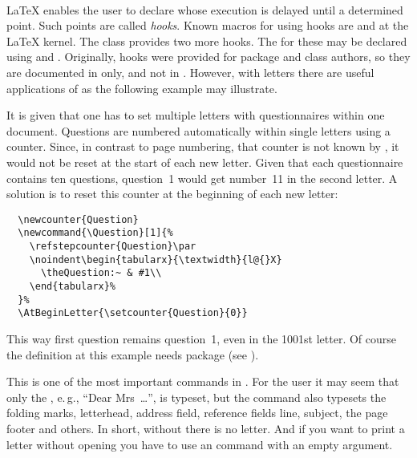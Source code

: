 \begin{Declaration}
  \\
\end{Declaration}
%
%
{\LaTeX} enables the user to declare  whose execution
is delayed until a determined point. Such points are called
\emph{hooks}. Known macros for using hooks are
 and
 at the \LaTeX{} kernel. The class
 provides two more hooks. The  for
these may be declared using  and
. Originally, hooks were
provided for package and class authors, so they are documented in
\cite{latex:clsguide} only, and not in \cite{latex:usrguide}. However, with
letters there are useful applications of  as the
following example may illustrate.
%
\begin{Example}
  It is given that one has to set multiple letters with questionnaires
  within one document. Questions are numbered automatically within
  single letters using a counter. Since, in contrast to page
  numbering, that counter is not known by , it would
  not be reset at the start of each new letter. Given that each
  questionnaire contains ten questions, question~1 would get number~11
  in the second letter. A solution is to reset this counter at the
  beginning of each new letter:
\begin{lstlisting}
  \newcounter{Question}
  \newcommand{\Question}[1]{%
    \refstepcounter{Question}\par
    \noindent\begin{tabularx}{\textwidth}{l@{}X}
      \theQuestion:~ & #1\\
    \end{tabularx}%
  }%
  \AtBeginLetter{\setcounter{Question}{0}}
\end{lstlisting}
  This way first question remains question~1, even in the 1001st letter. Of
  course the definition at this example needs package
   (see \cite{package:tabularx}).
\end{Example}
%
%
%


\begin{Declaration}
\end{Declaration}
%
This is one of the most important commands in .  For the user
it may seem that only the , e.\,g.,
``Dear Mrs~\dots'', is typeset, but the command also
typesets the folding marks,
letterhead, address field, reference
fields line, subject, the page
footer and others. In short, without  there
is no letter. And if you want to print a letter without opening you have to
use an  command with an empty argument.

